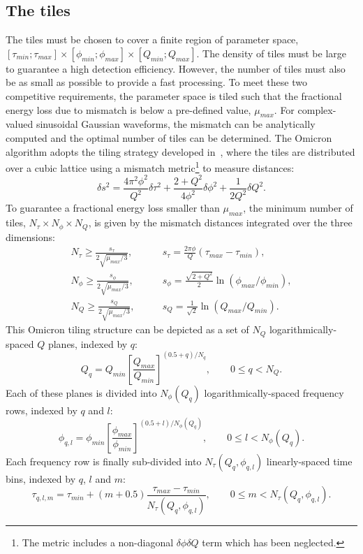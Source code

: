 \subsection{The tiles} \label{sec:method:tiles}
The tiles must be chosen to cover a finite region of parameter space, $[\tau_{min};\tau_{max}]\times [\phi_{min};\phi_{max}] \times [Q_{min};Q_{max}]$. The density of tiles must be large to guarantee a high detection efficiency. However, the number of tiles must also be as small as possible to provide a fast processing. To meet these two competitive requirements, the parameter space is tiled such that the fractional energy loss due to mismatch is below a pre-defined value, $\mu_{max}$. For complex-valued sinusoidal Gaussian waveforms, the mismatch can be analytically computed and the optimal number of tiles can be determined. The Omicron algorithm adopts the tiling strategy developed in~\cite{Chatterji:2004}, where the tiles are distributed over a cubic lattice using a mismatch metric\footnote{The metric includes a non-diagonal $\delta \phi \delta Q$ term which has been neglected.} to measure distances:
\begin{equation}
  \delta s^2 =
  \frac{4\pi^2\phi^2}{Q^2}\delta \tau^2
  + \frac{2+Q^2}{4\phi^2}\delta \phi^2
  + \frac{1}{2Q^2}\delta Q^2.
  \label{eq:tilemetric}
\end{equation}
To guarantee a fractional energy loss smaller than $\mu_{max}$, the minimum number of tiles, $N_\tau \times N_\phi \times N_Q$, is given by the mismatch distances integrated over the three dimensions:
\begin{align}
  N_\tau \ge \frac{s_\tau}{2\sqrt{\mu_{max}/3}},  & \qquad s_\tau = \frac{2\pi\phi}{Q}(\tau_{max} - \tau_{min}), \label{eq:tiledistancetau} \\
  N_\phi \ge \frac{s_\phi}{2\sqrt{\mu_{max}/3}},  & \qquad s_\phi = \frac{\sqrt{2+Q^2}}{2}\ln(\phi_{max}/\phi_{min}), \label{eq:tiledistancephi} \\
  N_Q \ge \frac{s_Q}{2\sqrt{\mu_{max}/3}},  & \qquad s_Q = \frac{1}{\sqrt{2}}\ln(Q_{max}/Q_{min}). \label{eq:tiledistanceq}
\end{align}
This Omicron tiling structure can be depicted as a set of $N_Q$ logarithmically-spaced $Q$ planes, indexed by $q$:
\begin{equation}
  Q_q = Q_{min}\left[ \frac{Q_{max}}{Q_{min}}\right]^{(0.5+q)/N_q}, \qquad 0\le q < N_Q.
  \label{eq:q}
\end{equation}
Each of these planes is divided into $N_\phi(Q_q)$ logarithmically-spaced frequency rows, indexed by $q$ and $l$:
\begin{equation}
  \phi_{q,l} = \phi_{min}\left[ \frac{\phi_{max}}{\phi_{min}}\right]^{(0.5+l)/N_\phi(Q_q)}, \qquad 0\le l < N_\phi(Q_q).
  \label{eq:phi}
\end{equation}
Each frequency row is finally sub-divided into $N_\tau(Q_q,\phi_{q,l})$ linearly-spaced time bins, indexed by $q$, $l$ and $m$:
\begin{equation}
  \tau_{q,l,m} = \tau_{min}+(m+0.5)\frac{\tau_{max}-\tau_{min}}{N_\tau(Q_q,\phi_{q,l})}, \qquad 0\le m < N_\tau(Q_q,\phi_{q,l}).
  \label{eq:tau}
\end{equation}


